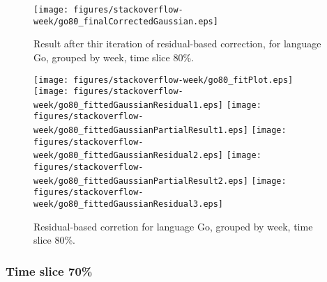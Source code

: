 \begin{figure}[]
\centering
{\texttt{[image: figures/stackoverflow-week/go80\_finalCorrectedGaussian.eps]}}
\caption{Result after thir iteration of residual-based correction, for language Go, grouped by week, time slice 80\%.}
\end{figure}


\begin{figure}[hb]
\centering
{}
{\texttt{[image: figures/stackoverflow-week/go80\_fitPlot.eps]}}
{\texttt{[image: figures/stackoverflow-week/go80\_fittedGaussianResidual1.eps]}}
{\texttt{[image: figures/stackoverflow-week/go80\_fittedGaussianPartialResult1.eps]}}
{\texttt{[image: figures/stackoverflow-week/go80\_fittedGaussianResidual2.eps]}}
{\texttt{[image: figures/stackoverflow-week/go80\_fittedGaussianPartialResult2.eps]}}
{\texttt{[image: figures/stackoverflow-week/go80\_fittedGaussianResidual3.eps]}}
\caption{Residual-based corretion for language Go, grouped by week, time slice 80\%.}
\end{figure}


\clearpage 
\newpage 


\FloatBarrier

\subsubsection{Time slice 70\%}

